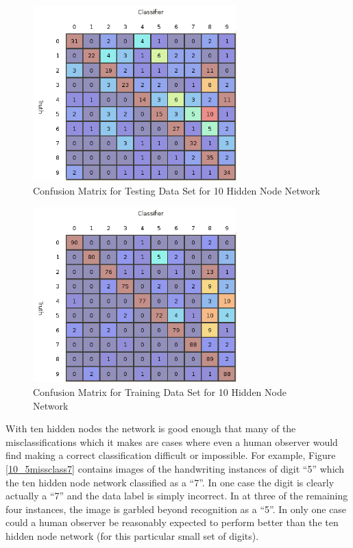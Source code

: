 \documentclass{article}
\begin{document}
\begin{figure}
\centering
\includegraphics[width=0.7\textwidth]{data/final/10_test_confusion.png}
\caption{Confusion Matrix for Testing Data Set for 10 Hidden Node Network}
\label{testconfusion10}
\end{figure}

\begin{figure}
\centering
\includegraphics[width=0.7\textwidth]{data/final/10_train_confusion.png}
\caption{Confusion Matrix for Training Data Set for 10 Hidden Node Network}
\label{trainconfusion10}
\end{figure}

With ten hidden nodes the network is good enough that many of the misclassifications which it makes are cases where even a human observer would find making a correct classification difficult or impossible. For example, Figure \ref{10_5missclass7} contains images of the handwriting instances of digit ``5'' which the ten hidden node network classified as a ``7''. In one case the digit is clearly actually a ``7'' and the data label is simply incorrect. In at three of the remaining four instances, the image is garbled beyond recognition as a ``5''. In only one case could a human observer be reasonably expected to perform better than the ten hidden node network (for this particular small set of digits).
\end{document}
